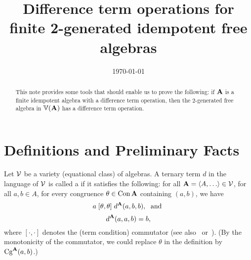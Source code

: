 



\usepackage{inputs/macros}



\title[Difference Term Operation for $\bF_{\sV}(2)$]
{Difference term operations for finite 2-generated idempotent free algebras}
\date{\today}
\address{University of Hawaii}


\maketitle

\renewcommand{\etaR}{\ensuremath{\eta}}

\begin{abstract}
This note provides some tools that should enable us to prove
the following: if $\mathbf{A}$ is a finite idempotent algebra with a
difference term operation, then the 2-generated free algebra in $\operatorname{\mathbb{V}}(\mathbf{A})$ has
a difference term operation.  
\end{abstract}

\section{Definitions and Preliminary Facts}
\label{sec:facts}

Let $\mathcal{V}$ be a variety (equational class) of algebras.
A ternary term $d$ in the language of $\mathcal{V}$ is called 
a  if it satisfies the following:
for all $\bA = \<A, \dots \> \in \sV$, for all $a, b \in A$, for every 
congruence $\theta\in \operatorname{Con}\mathbf{A}$ containing $(a,b)$, we have
\begin{equation}
  \label{dt-rel}
  a \mathrel{[\theta, \theta]} d^{\mathbf{A}}(a,b,b), \; \text{ and }
\end{equation}
\begin{equation}
  \label{dt-id}
d^{\mathbf{A}}(a,a,b) = b, 
\end{equation}
where %
$[\cdot, \cdot]$ denotes the (term condition) commutator
(see also~\cite{HM:1988} or~\cite{MR3076179}).
(By the monotonicity of the commutator, we could replace $\theta$ in the
definition by $\operatorname{Cg}^{\mathbf{A}}(a,b)$.)

